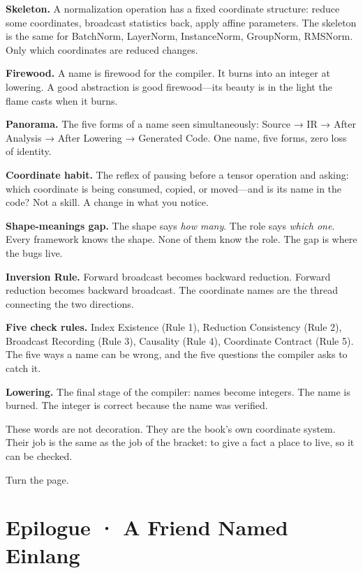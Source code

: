 \documentclass[11pt,titlepage]{article}
\begin{document}
\textbf{Skeleton.} A normalization operation has a fixed coordinate
structure: reduce some coordinates, broadcast statistics back, apply
affine parameters. The skeleton is the same for BatchNorm, LayerNorm,
InstanceNorm, GroupNorm, RMSNorm. Only which coordinates are reduced
changes.

\textbf{Firewood.} A name is firewood for the compiler. It burns into an
integer at lowering. A good abstraction is good firewood---its beauty is
in the light the flame casts when it burns.

\textbf{Panorama.} The five forms of a name seen simultaneously: Source
→ IR → After Analysis → After Lowering → Generated Code. One name, five
forms, zero loss of identity.

\textbf{Coordinate habit.} The reflex of pausing before a tensor
operation and asking: which coordinate is being consumed, copied, or
moved---and is its name in the code? Not a skill. A change in what you
notice.

\textbf{Shape-meanings gap.} The shape says \emph{how many}. The role
says \emph{which one}. Every framework knows the shape. None of them
know the role. The gap is where the bugs live.

\textbf{Inversion Rule.} Forward broadcast becomes backward reduction.
Forward reduction becomes backward broadcast. The coordinate names are
the thread connecting the two directions.

\textbf{Five check rules.} Index Existence (Rule 1), Reduction
Consistency (Rule 2), Broadcast Recording (Rule 3), Causality (Rule 4),
Coordinate Contract (Rule 5). The five ways a name can be wrong, and the
five questions the compiler asks to catch it.

\textbf{Lowering.} The final stage of the compiler: names become
integers. The name is burned. The integer is correct because the name
was verified.

These words are not decoration. They are the book's own coordinate
system. Their job is the same as the job of the bracket: to give a fact
a place to live, so it can be checked.

Turn the page.

\newpage

\hypertarget{epilogue-a-friend-named-einlang}{%
\section{Epilogue · A Friend Named
Einlang}\label{epilogue-a-friend-named-einlang}}
\end{document}
